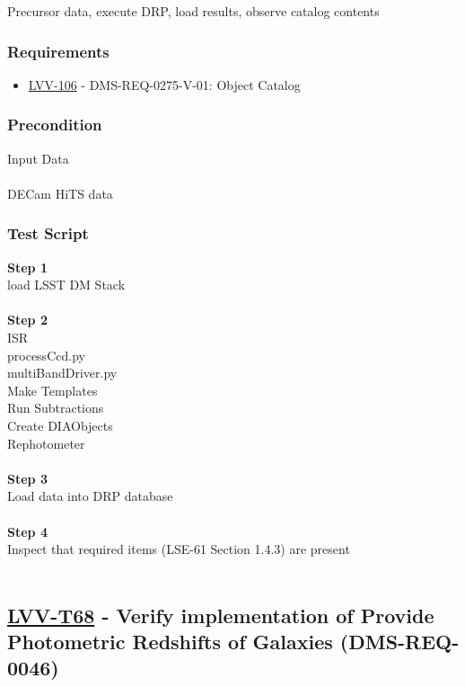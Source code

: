 Precursor data, execute DRP, load results, observe catalog contents

\hypertarget{requirements-157}{%
\subsubsection{Requirements}\label{requirements-157}}

\begin{itemize}
\tightlist
\item
  \href{https://jira.lsstcorp.org/browse/LVV-106}{LVV-106} -
  DMS-REQ-0275-V-01: Object Catalog
\end{itemize}

\hypertarget{precondition-3}{%
\subsubsection{Precondition}\label{precondition-3}}

Input Data\\
~\\
DECam HiTS data

\hypertarget{test-script-157}{%
\subsubsection{Test Script}\label{test-script-157}}

\textbf{Step 1}\\
load LSST DM Stack\\
~\\
\textbf{Step 2}\\
ISR\\
processCcd.py\\
multiBandDriver.py\\
Make Templates\\
Run Subtractions\\
Create DIAObjects\\
Rephotometer\\
~\\
\textbf{Step 3}\\
Load data into DRP database\\
~\\
\textbf{Step 4}\\
Inspect that required items (LSE-61 Section 1.4.3) are present\\
~\\

\hypertarget{lvv-t68---verify-implementation-of-provide-photometric-redshifts-of-galaxies-dms-req-0046}{%
\subsection{\texorpdfstring{\href{https://jira.lsstcorp.org/secure/Tests.jspa\#/testCase/LVV-T68}{LVV-T68}
- Verify implementation of Provide Photometric Redshifts of Galaxies
(DMS-REQ-0046)}{LVV-T68 - Verify implementation of Provide Photometric Redshifts of Galaxies (DMS-REQ-0046)}}\label{lvv-t68---verify-implementation-of-provide-photometric-redshifts-of-galaxies-dms-req-0046}}

